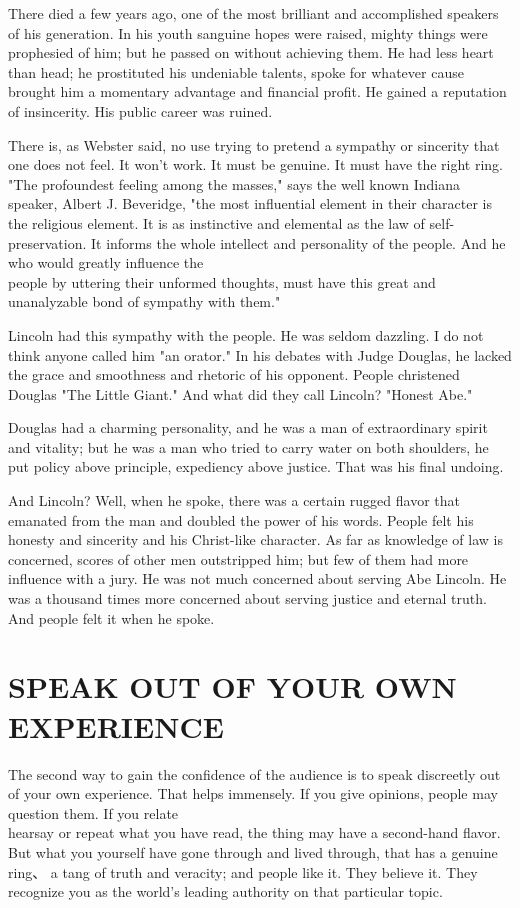 \documentclass[10pt]{article}
\begin{document}
There died a few years ago, one of the most brilliant and accomplished speakers of his generation. In his youth sanguine hopes were raised, mighty things were prophesied of him; but he passed on without achieving them. He had less heart than head; he prostituted his undeniable talents, spoke for whatever cause brought him a momentary advantage and financial profit. He gained a reputation of insincerity. His public career was ruined.

There is, as Webster said, no use trying to pretend a sympathy or sincerity that one does not feel. It won't work. It must be genuine. It must have the right ring.\\
"The profoundest feeling among the masses," says the well known Indiana speaker, Albert J. Beveridge, "the most influential element in their character is the religious element. It is as instinctive and elemental as the law of self-preservation. It informs the whole intellect and personality of the people. And he who would greatly influence the\\
people by uttering their unformed thoughts, must have this great and unanalyzable bond of sympathy with them."

Lincoln had this sympathy with the people. He was seldom dazzling. I do not think anyone called him "an orator." In his debates with Judge Douglas, he lacked the grace and smoothness and rhetoric of his opponent. People christened Douglas "The Little Giant." And what did they call Lincoln? "Honest Abe."

Douglas had a charming personality, and he was a man of extraordinary spirit and vitality; but he was a man who tried to carry water on both shoulders, he put policy above principle, expediency above justice. That was his final undoing.

And Lincoln? Well, when he spoke, there was a certain rugged flavor that emanated from the man and doubled the power of his words. People felt his honesty and sincerity and his Christ-like character. As far as knowledge of law is concerned, scores of other men outstripped him; but few of them had more influence with a jury. He was not much concerned about serving Abe Lincoln. He was a thousand times more concerned about serving justice and eternal truth. And people felt it when he spoke.

\section*{SPEAK OUT OF YOUR OWN EXPERIENCE}
The second way to gain the confidence of the audience is to speak discreetly out of your own experience. That helps immensely. If you give opinions, people may question them. If you relate\\
hearsay or repeat what you have read, the thing may have a second-hand flavor. But what you yourself have gone through and lived through, that has a genuine ring、 a tang of truth and veracity; and people like it. They believe it. They recognize you as the world's leading authority on that particular topic.
\end{document}
